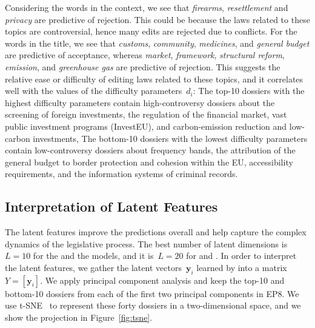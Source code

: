 Considering the words in the context, we see that \textit{firearms}, \textit{resettlement} and \textit{privacy} are predictive of rejection.
This could be because the laws related to these topics are controversial, hence many edits are rejected due to conflicts.
For the words in the title, we see that \textit{customs}, \textit{community}, \textit{medicines}, and \textit{general budget} are predictive of acceptance, whereas \textit{market}, \textit{framework}, \textit{structural reform}, \textit{emission},  and \textit{greenhouse gas} are predictive of rejection.
This suggests the relative ease or difficulty of editing laws related to these topics, and it correlates well with the values of the difficulty parameters~$d_i$:
The top-10 dossiers with the highest difficulty parameters contain high-controversy dossiers about the screening of foreign investments, the regulation of the financial market, vast public investment programs (InvestEU), and  carbon-emission reduction and low-carbon investments,
The bottom-10 dossiers with the lowest difficulty parameters contain low-controversy dossiers about frequency bands, the attribution of the general budget to border protection and cohesion within the EU, accessibility requirements, and the information systems of criminal records.

\subsection{Interpretation of Latent Features}

The latent features improve the predictions overall and help capture the complex dynamics of the legislative process.
The best number of latent dimensions is~$L = 10$  for the  and the  models, and it is~$L = 20$ for  and .
In order to interpret the latent features, we gather the latent vectors~$\bm{y}_i$ learned by  into a matrix~$Y = [ \bm{y}_i ]$.
We apply principal component analysis and keep the top-10 and bottom-10 dossiers from each of the first two principal components in EP8.
We use t-SNE~\cite{maaten2008visualizing} to represent these forty dossiers in a two-dimensional space, and we show the projection in Figure~\ref{fig:tsne}.

